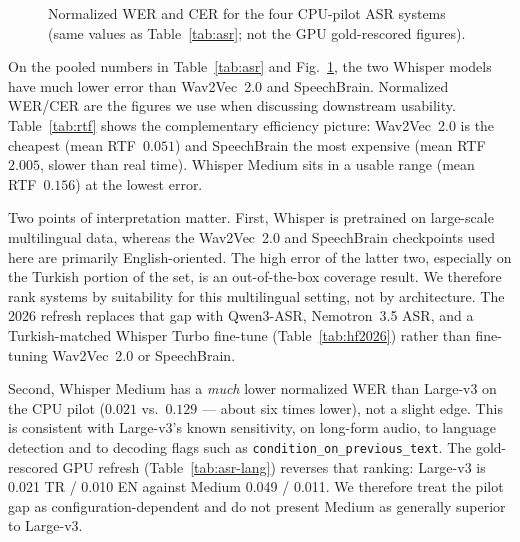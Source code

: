 \documentclass[conference]{IEEEtran}
\begin{document}
\begin{figure}[t]
\centering
{}
\caption{Normalized WER and CER for the four CPU-pilot ASR systems (same values as Table~\ref{tab:asr}; not the GPU gold-rescored figures).}
\label{fig:wer}
\end{figure}

On the pooled numbers in Table~\ref{tab:asr} and Fig.~\ref{fig:wer}, the two Whisper models have much lower error than Wav2Vec~2.0 and SpeechBrain. Normalized WER/CER are the figures we use when discussing downstream usability. Table~\ref{tab:rtf} shows the complementary efficiency picture: Wav2Vec~2.0 is the cheapest (mean RTF~$0.051$) and SpeechBrain the most expensive (mean RTF~$2.005$, slower than real time). Whisper Medium sits in a usable range (mean RTF~$0.156$) at the lowest error.

Two points of interpretation matter. First, Whisper is pretrained on large-scale multilingual data, whereas the Wav2Vec~2.0 and SpeechBrain checkpoints used here are primarily English-oriented. The high error of the latter two, especially on the Turkish portion of the set, is an out-of-the-box coverage result. We therefore rank systems by suitability for this multilingual setting, not by architecture. The 2026 refresh replaces that gap with Qwen3-ASR, Nemotron~3.5 ASR, and a Turkish-matched Whisper Turbo fine-tune (Table~\ref{tab:hf2026}) rather than fine-tuning Wav2Vec~2.0 or SpeechBrain.

Second, Whisper Medium has a \emph{much} lower normalized WER than Large-v3 on the CPU pilot ($0.021$ vs.\ $0.129$ --- about six times lower), not a slight edge. This is consistent with Large-v3's known sensitivity, on long-form audio, to language detection and to decoding flags such as \texttt{condition\_on\_previous\_text}. The gold-rescored GPU refresh (Table~\ref{tab:asr-lang}) reverses that ranking: Large-v3 is 0.021 TR / 0.010 EN against Medium 0.049 / 0.011. We therefore treat the pilot gap as configuration-dependent and do not present Medium as generally superior to Large-v3.
\end{document}

